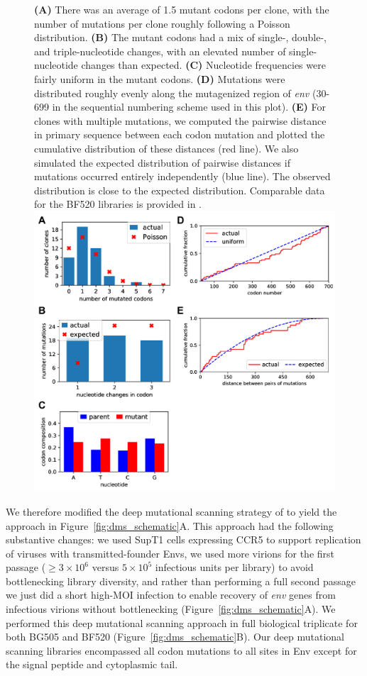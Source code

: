 \documentclass[9pt]{elife}
\begin{document}
\begin{figure}
{{\bf(A)} There was an average of 1.5 mutant codons per clone, with the number of mutations per clone roughly following a Poisson distribution. 
{\bf(B)} The mutant codons had a mix of single-, double-, and triple-nucleotide changes, with an elevated number of single-nucleotide changes than expected.
{\bf(C)} Nucleotide frequencies were fairly uniform in the mutant codons.
{\bf(D)} Mutations were distributed roughly evenly along the mutagenized region of {\it env} (30-699 in the sequential numbering scheme used in this plot).
{\bf(E)} For clones with multiple mutations, we computed the pairwise distance in primary sequence between each codon mutation and plotted the cumulative distribution of these distances (red line). 
We also simulated the expected distribution of pairwise distances if mutations occurred entirely independently (blue line). 
The observed distribution is close to the expected distribution.
Comparable data for the BF520 libraries is provided in \citet{dingens2017comprehensive}.
}{\includegraphics[width=\textwidth]{figures/sanger_sequencing_supp/sanger_sequencing_supp.pdf}}
\end{figure}

We therefore modified the deep mutational scanning strategy of \citet{haddox2016experimental} to yield the approach in Figure~\ref{fig:dms_schematic}A.
This approach had the following substantive changes: we used SupT1 cells expressing CCR5 to support replication of viruses with transmitted-founder Envs, we used more virions for the first passage ($\ge 3 \times 10^6$ versus $5\times 10^5$ infectious units per library) to avoid bottlenecking library diversity, and rather than performing a full second passage we just did a short high-MOI infection to enable recovery of \textit{env} genes from infectious virions without bottlenecking (Figure~\ref{fig:dms_schematic}A).
We performed this deep mutational scanning approach in full biological triplicate for both BG505 and BF520 (Figure~\ref{fig:dms_schematic}B).
Our deep mutational scanning libraries encompassed all codon mutations to all sites in Env except for the signal peptide and cytoplasmic tail.
\end{document}
